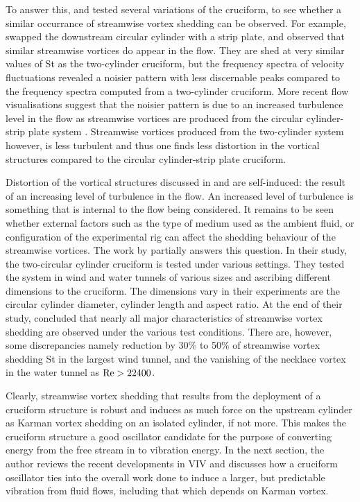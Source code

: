 \documentclass[oneside]{utmthesis}
\begin{document}
To answer this, \citet{Kato2007} and \citet{Nguyen2010} tested several variations of the cruciform, to see whether a similar occurrance of streamwise vortex shedding can be observed. For example, \citet{Kato2007} swapped the downstream circular cylinder with a strip plate, and observed that similar streamwise vortices do appear in the flow. They are shed at very similar values of St as the two-cylinder cruciform, but the frequency spectra of velocity fluctuations revealed a noisier pattern with less discernable peaks compared to the frequency spectra computed from a two-cylinder cruciform. More recent flow visualisations suggest that the noisier pattern is due to an increased turbulence level in the flow as streamwise vortices are produced from the circular cylinder-strip plate system \citep{Koide2017}. Streamwise vortices produced from the two-cylinder system however, is less turbulent and thus one finds less distortion in the vortical structures compared to the circular cylinder-strip plate cruciform.

Distortion of the vortical structures discussed in \citet{Kato2007} and \citet{Koide2017} are self-induced: the result of an increasing level of turbulence in the flow. An increased level of turbulence is something that is internal to the flow being considered. It remains to be seen whether external factors such as the type of medium used as the ambient fluid, or configuration of the experimental rig can affect the shedding behaviour of the streamwise vortices. The work by \citet{Nguyen2010} partially answers this question. In their study, the two-circular cylinder cruciform is tested under various settings. They tested the system in wind and water tunnels of various sizes and ascribing different dimensions to the cruciform. The dimensions \citet{Nguyen2010} vary in their experiments are the circular cylinder diameter, cylinder length and aspect ratio. At the end of their study, \citet{Nguyen2010} concluded that nearly all major characteristics of streamwise vortex shedding are observed under the various test conditions. There are, however, some discrepancies namely reduction by 30\% to 50\% of streamwise vortex shedding St in the largest wind tunnel, and the vanishing of the necklace vortex in the water tunnel as $\text{Re} > 22400$.

Clearly, streamwise vortex shedding that results from the deployment of a cruciform structure is robust and induces as much force on the upstream cylinder as Karman vortex shedding on an isolated cylinder, if not more. This makes the cruciform structure a good oscillator candidate for the purpose of converting energy from the free stream in to vibration energy. In the next section, the author reviews the recent developments in VIV and discusses how a cruciform oscillator ties into the overall work done to induce a larger, but predictable vibration from fluid flows, including that which depends on Karman vortex.
\end{document}
